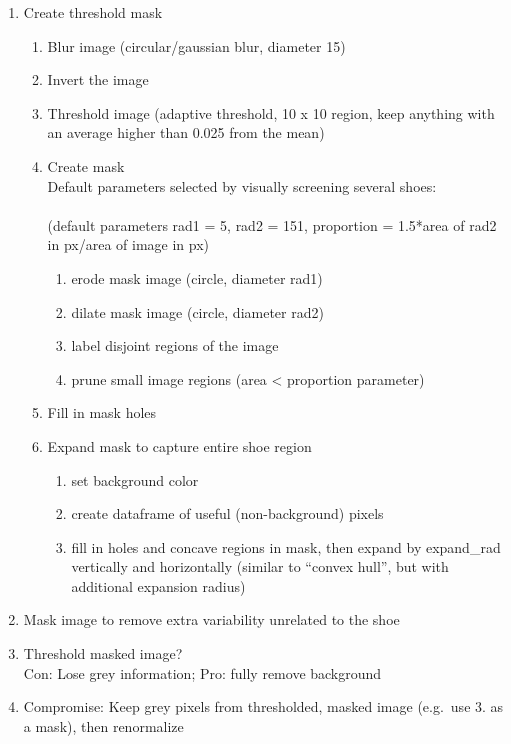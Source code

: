 \documentclass[]{book}
\providecommand{\tightlist}{%
  \setlength{\itemsep}{0pt}\setlength{\parskip}{0pt}}
\begin{document}
\begin{enumerate}
\def\labelenumi{\arabic{enumi}.}
\item
  Create threshold mask

  \begin{enumerate}
  \def\labelenumii{\alph{enumii}.}
  \tightlist
  \item
    Blur image (circular/gaussian blur, diameter 15)\\
  \item
    Invert the image\\
  \item
    Threshold image (adaptive threshold, 10 x 10 region, keep anything with an average higher than 0.025 from the mean)\\
  \item
    Create mask\\
    Default parameters selected by visually screening several shoes:\\
    ~\\
    (default parameters rad1 = 5, rad2 = 151, proportion = 1.5*area of rad2 in px/area of image in px)\\

    \begin{enumerate}
    \def\labelenumiii{\arabic{enumiii}.}
    \tightlist
    \item
      erode mask image (circle, diameter rad1)
    \item
      dilate mask image (circle, diameter rad2)
    \item
      label disjoint regions of the image
    \item
      prune small image regions (area \textless{} proportion parameter)
    \end{enumerate}
  \item
    Fill in mask holes\\
  \item
    Expand mask to capture entire shoe region

    \begin{enumerate}
    \def\labelenumiii{\arabic{enumiii}.}
    \tightlist
    \item
      set background color
    \item
      create dataframe of useful (non-background) pixels
    \item
      fill in holes and concave regions in mask, then expand by expand\_rad vertically and horizontally (similar to ``convex hull'', but with additional expansion radius)
    \end{enumerate}
  \end{enumerate}
\item
  Mask image to remove extra variability unrelated to the shoe\\
\item
  Threshold masked image?\\
  Con: Lose grey information; Pro: fully remove background\\
\item
  Compromise: Keep grey pixels from thresholded, masked image (e.g.~use 3. as a mask), then renormalize\\
\end{enumerate}
\end{document}
